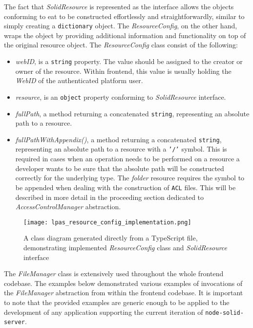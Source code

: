 The fact that \textit{SolidResource} is represented as the interface allows the objects conforming to eat to be constructed effortlessly and straightforwardly, similar to simply creating a \texttt{dictionary} object. The \textit{ResourceConfig}, on the other hand, wraps the object by providing additional information and functionality on top of the original resource object. The \textit{ResourceConfig} class consist of the following:
\begin{itemize}
    \item \textit{webID}, is a \texttt{string} property. The value should be assigned to the creator or owner of the resource. Within \lpa{} frontend, this value is usually holding the \textit{WebID} of the authenticated platform user.  
    \item \textit{resource}, is an \texttt{object} property conforming to \textit{SolidResource} interface. 
    \item \textit{fullPath}, a method returning a concatenated \texttt{string}, representing an absolute path to a resource.
    \item \textit{fullPathWithAppendix()}, a method returning a concatenated \texttt{string}, representing an absolute path to a resource with a \texttt{'/'} symbol. This is required in cases when an operation needs to be performed on a resource a developer wants to be sure that the absolute path will be constructed correctly for the underlying type. The \textit{folder} resource requires the symbol to be appended when dealing with the construction of \texttt{ACL} files. This will be described in more detail in the proceeding section dedicated to \textit{AccessControlManager} abstraction.
\end{itemize}

\begin{figure}[h]
\centering
\texttt{[image: lpas\_resource\_config\_implementation.png]}
\caption{A class diagram generated directly from a TypeScript file, demonstrating implemented \textit{ResourceConfig} class and \textit{SolidResource} interface}
\label{fig:lpas_resource_config_implementation}
\end{figure}


The \textit{FileManager} class is extensively used throughout the whole \lpa{} frontend codebase. The examples below demonstrated various examples of invocations of the \textit{FileManager} abstraction from within the \lpa{} frontend codebase. It is important to note that the provided examples are generic enough to be applied to the development of any \solid{} application supporting the current iteration of \texttt{node-solid-server}.

